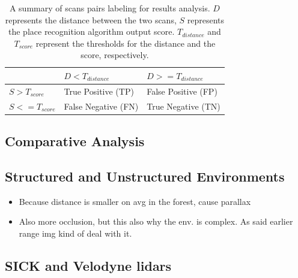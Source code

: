 
\begin{table}[H]
    \centering
    \begin{tabular}{@{}l|ll@{}}
        \toprule
                                  & \textbf{$D < T_{distance}$} & \textbf{$D >= T_{distance}$} \\
        \hline
        \textbf{$S > T_{score}$}  & True Positive (TP)          & False Positive (FP) \\
        \textbf{$S <= T_{score}$} & False Negative (FN)         & True Negative (TN) \\
        \bottomrule
    \end{tabular}
    \caption[Summary of scans pairs labeling for results analysis]{A summary of scans pairs labeling for results analysis. $D$ represents the distance between the two scans, $S$ represents the place recognition algorithm output score. $T_{distance}$ and $T_{score}$ represent the thresholds for the distance and the score, respectively.}
    \label{tab:chap_slam_results_labeling}
\end{table}


\subsection{Comparative Analysis}
\label{ssec:chap_slam_comparative_analysis}

\subsection{Structured and Unstructured Environments}
\label{ssec:chap_slam_struct_vs_forest}
\begin{itemize}
    \item Because distance is smaller on avg in the forest, cause parallax
    \item Also more occlusion, but this also why the env. is complex. As said earlier range img kind of deal with it.
\end{itemize}

\subsection{SICK and Velodyne \gls*{lidar}s}
\label{ssec:chap_slam_sick_vs_velodyne}


